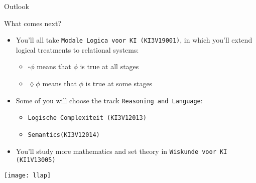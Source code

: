 \begin{frame}{Outlook}

What comes next?
  
  \begin{itemize}
  \item You'll all take \texttt{Modale Logica voor KI (KI3V19001)}, in
    which you'll extend logical treatments to relational systems:
    \begin{itemize}
    \item $\square \phi$ means that $\phi$ is true at all stages
      \item $\lozenge\phi$ means that $\phi$ is true at some stages
      \end{itemize}
      \item Some of you will choose the track \texttt{Reasoning and
          Language}:
        \begin{itemize}
        \item \texttt{Logische Complexiteit (KI3V12013)}
          \item \texttt{Semantics(KI3V12014)}
          \end{itemize}
          \item You'll study more mathematics and set theory in
            \texttt{Wiskunde voor KI (KI1V13005)}
  \end{itemize}
  
\end{frame}


\begin{frame}
  
\begin{center}
  \texttt{[image: llap]}
\end{center}

\end{frame}
